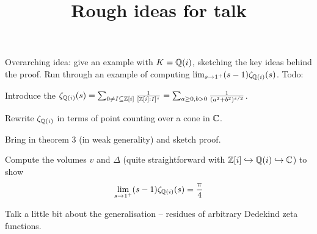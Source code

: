 \documentclass[11pt]{article}
\title{Rough ideas for talk}
\begin{document}
\maketitle


Overarching idea: give an example with $K = \mathbb{Q}(i)$, sketching the key ideas behind the proof. Run through an example of computing $\lim_{s \to 1^+} (s - 1)\zeta_{\mathbb{Q}(i)}(s)$. Todo:
\begin{enum}
    \item Introduce the $\zeta_{\mathbb{Q}(i)}(s) = \sum_{0 \neq I \subseteq \mathbb{Z}[i]}\frac1{[\mathbb{Z}[i] : I]^s} = \sum_{a \geq 0, b > 0}\frac1{(a^2 + b^2)^{s/2}}$.
    \item Rewrite $\zeta_{\mathbb{Q}(i)}$ in terms of point counting over a cone in $\mathbb{C}$.
    \item Bring in theorem 3 (in weak generality) and sketch proof.
    \item Compute the volumes $v$ and $\Delta$ (quite straightforward with $\mathbb{Z}[i] \hookrightarrow \mathbb{Q}(i) \hookrightarrow \mathbb{C}$) to show 
    $$
        \lim_{s \to 1^+}(s - 1)\zeta_{\mathbb{Q}(i)}(s) = \frac\pi4
    $$
    \item Talk a little bit about the generalisation -- residues of arbitrary Dedekind zeta functions.
\end{enum}
\end{document}
